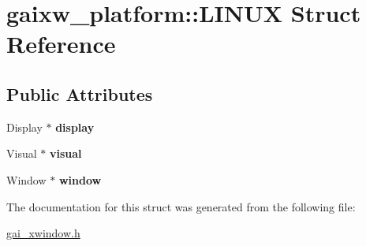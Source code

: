 \hypertarget{structgaixw__platform_1_1_l_i_n_u_x}{}\section{gaixw\+\_\+platform\+:\+:L\+I\+N\+UX Struct Reference}
\label{structgaixw__platform_1_1_l_i_n_u_x}
\subsection*{Public Attributes}
\begin{DoxyCompactItemize}
\item 
\mbox{\label{structgaixw__platform_1_1_l_i_n_u_x_a77b180a054dbb37600a2900bfd966a74}} 
Display $\ast$ {\bfseries display}
\item 
\mbox{\label{structgaixw__platform_1_1_l_i_n_u_x_ad65943f512f916a117371b38289e1792}} 
Visual $\ast$ {\bfseries visual}
\item 
\mbox{\label{structgaixw__platform_1_1_l_i_n_u_x_abbf5ab09ddf03c12f7c6232849d9599e}} 
Window $\ast$ {\bfseries window}
\end{DoxyCompactItemize}


The documentation for this struct was generated from the following file\+:\begin{DoxyCompactItemize}
\item 
\hyperlink{gai__xwindow_8h}{gai\+\_\+xwindow.\+h}\end{DoxyCompactItemize}
